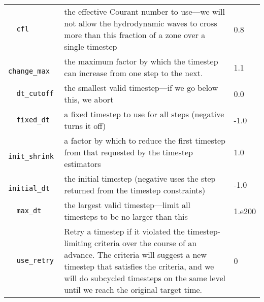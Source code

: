 \begin{landscape}
{\begin{center}
\begin{longtable}{|l|p{5.25in}|l|}
\rowcolor{tableShade}
\verb=  cfl  = &   the effective Courant number to use---we will not allow the hydrodynamic waves to cross more than this fraction of a zone over a single timestep  &  0.8 \\
\verb=  change_max  = &   the maximum factor by which the timestep can increase from one step to the next.  &  1.1 \\
\rowcolor{tableShade}
\verb=  dt_cutoff  = &   the smallest valid timestep---if we go below this, we abort  &  0.0 \\
\verb=  fixed_dt  = &   a fixed timestep to use for all steps (negative turns it off)  &  -1.0 \\
\rowcolor{tableShade}
\verb=  init_shrink  = &   a factor by which to reduce the first timestep from that requested by the timestep estimators  &  1.0 \\
\verb=  initial_dt  = &   the initial timestep (negative uses the step returned from the timestep constraints)  &  -1.0 \\
\rowcolor{tableShade}
\verb=  max_dt  = &   the largest valid timestep---limit all timesteps to be no larger than this  &  1.e200 \\
\verb=  use_retry  = &   Retry a timestep if it violated the timestep-limiting criteria over the course of an advance. The criteria will suggest a new timestep that satisfies the criteria, and we will do subcycled timesteps on the same level until we reach the original target time.  &  0 \\


\end{longtable}
\end{center}

} %


\end{landscape}

%


